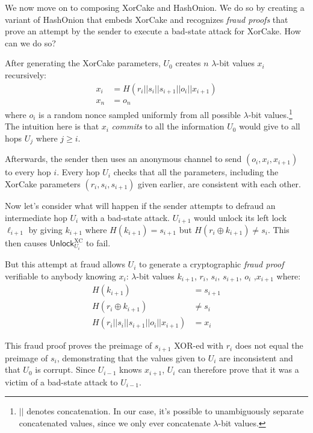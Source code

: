 \documentclass[USenglish,oneside,twocolumn]{article}
\begin{document}
We now move on to composing XorCake and HashOnion. We do so by creating a variant of HashOnion that embeds XorCake and recognizes \emph{fraud proofs} that prove an attempt by the sender to execute a bad-state attack for XorCake. How can we do so?

After generating the XorCake parameters, $U_0$ creates $n$ $\lambda$-bit values $x_i$ recursively:
\begin{align*}
    x_i & = H(r_i||s_i||s_{i+1}||o_i||x_{i+1}) \\
    x_n & = o_n
\end{align*}
where $o_i$ is a random nonce sampled uniformly from all possible $\lambda$-bit values.\footnote{$||$ denotes concatenation. In our case, it's possible to unambiguously separate concatenated values, since we only ever concatenate $\lambda$-bit values.} The intuition here is that $x_i$ \emph{commits} to all the information $U_0$ would give to all hops $U_j$ where $j\geq i$.

Afterwards, the sender then uses an anonymous channel to send $(o_i,x_i,x_{i+1})$ to every hop $i$. Every hop $U_i$ checks that all the parameters, including the XorCake parameters $(r_i,s_i,s_{i+1})$ given earlier, are consistent with each other.

Now let's consider what will happen if the sender attempts to defraud an intermediate hop $U_i$ with a bad-state attack. $U_{i+1}$ would unlock its left lock $\ell_{i+1}$ by giving $k_{i+1}$ where $H(k_{i+1})= s_{i+1}$ but $H(r_i\oplus k_{i+1})\neq s_i$. This then causes $\mathsf{Unlock}^\mathrm{XC}_{U_i}$ to fail.

But this attempt at fraud allows $U_i$ to generate a cryptographic \emph{fraud proof} verifiable to anybody knowing $x_i$: $\lambda$-bit values $k_{i+1}$, $r_i$, $s_i$, $s_{i+1}$, $o_i$ ,$x_{i+1}$ where:
\begin{align*}
    H(k_{i+1})                         & = s_{i+1} \\
    H(r_i \oplus k_{i+1})              & \neq s_i  \\
    H(r_i||s_i||s_{i+1}||o_i||x_{i+1}) & = x_i
\end{align*}

This fraud proof proves the preimage of $s_{i+1}$ XOR-ed with $r_i$ does not equal the preimage of $s_i$, demonstrating that the values given to $U_i$ are inconsistent and that $U_0$ is corrupt. Since $U_{i-1}$ knows $x_{i+1}$, $U_i$ can therefore prove that it was a victim of a bad-state attack to $U_{i-1}$.
\end{document}
